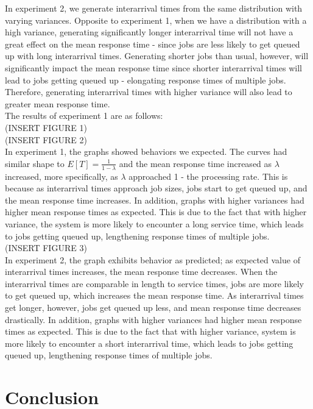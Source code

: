 \documentclass[12pt]{article}
\begin{document}
In experiment 2, we generate interarrival times from the same distribution with varying variances. Opposite to experiment 1, when we have a distribution with a high variance, generating significantly longer interarrival time will not have a great effect on the mean response time - since jobs are less likely to get queued up with long interarrival times. Generating shorter jobs than usual, however, will significantly impact the mean response time since shorter interarrival times will lead to jobs getting queued up - elongating response times of multiple jobs. Therefore, generating interarrival times with higher variance will also lead to greater mean response time. \\ 

The results of experiment 1 are as follows: \\ 

(INSERT FIGURE 1) \\
(INSERT FIGURE 2) \\ 

In experiment 1, the graphs showed behaviors we expected. The curves had similar shape to $E[T] = \frac{1}{1-\lambda}$ and the mean response time increased as $\lambda$ increased, more specifically, as $\lambda$ approached 1 - the processing rate. This is because as interarrival times approach job sizes, jobs start to get queued up, and the mean response time increases. In addition, graphs with higher variances had higher mean response times as expected. This is due to the fact that with higher variance, the system is more likely to encounter a long service time, which leads to jobs getting queued up, lengthening response times of multiple jobs. \\

(INSERT FIGURE 3) \\ 

In experiment 2, the graph exhibits behavior as predicted; as expected value of interarrival times increases, the mean response time decreases. When the interarrival times are comparable in length to service times, jobs are more likely to get queued up, which increases the mean response time. As interarrival times get longer, however, jobs get queued up less, and mean response time decreases drastically. In addition, graphs with higher variances had higher mean response times as expected. This is due to the fact that with higher variance, system is more likely to encounter a short interarrival time, which leads to jobs getting queued up, lengthening response times of multiple jobs. 

\section{Conclusion}
\end{document}
